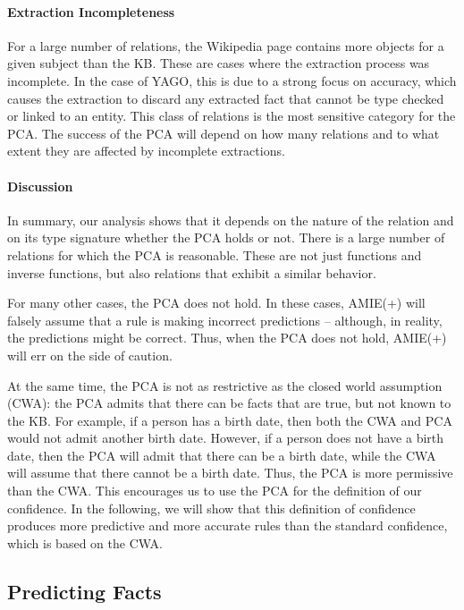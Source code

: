 \paragraph{Extraction Incompleteness} For a large number of relations, the Wikipedia page contains more objects for a given subject than the KB.
These are cases where the extraction process was incomplete.
In the case of YAGO, this is due to a strong focus on accuracy,
which causes the extraction to discard any extracted fact that cannot be type checked or linked to an entity.
This class of relations is the most sensitive category for the PCA.
The success of the PCA will depend on how many relations and to what extent they are affected by incomplete extractions.

\paragraph{Discussion} In summary, our analysis shows that it depends on the nature of the relation and on its type signature whether the PCA holds or not.
 There is a large number of relations for which the PCA is reasonable.
These are not just functions and inverse functions, but also relations that exhibit a similar behavior.

For many other cases, the PCA does not hold. In these cases, AMIE(+) will falsely assume that a rule is making incorrect predictions -- although, in reality,
the predictions might be correct.
Thus, when the PCA does not hold, AMIE(+) will err on the side of caution.

At the same time, the PCA is not as restrictive as the closed world assumption (CWA):
the PCA admits that there can be facts that are true, but not known to the KB.
For example, if a person has a birth date, then both the CWA and PCA would not admit another birth date. However, if a person does not have a birth date, then the PCA will admit that there can be a birth date, while the CWA will assume that there cannot be a birth date. Thus, the PCA is more permissive than the CWA.
This encourages us to use the PCA for the definition of our confidence. In the following, we will show that this definition of confidence produces
 more predictive and more accurate rules than the standard confidence, which is based on the CWA.

\subsection{Predicting Facts}
\label{prediction}


